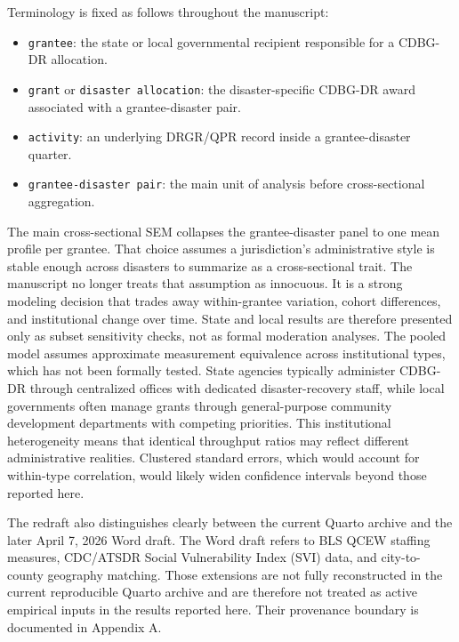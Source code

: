 \documentclass[
  letterpaper,
]{article}
\providecommand{\tightlist}{%
  \setlength{\itemsep}{0pt}\setlength{\parskip}{0pt}}
\begin{document}
Terminology is fixed as follows throughout the manuscript:

\begin{itemize}
\tightlist
\item
  \texttt{grantee}: the state or local governmental recipient
  responsible for a CDBG-DR allocation.
\item
  \texttt{grant} or \texttt{disaster\ allocation}: the disaster-specific
  CDBG-DR award associated with a grantee-disaster pair.
\item
  \texttt{activity}: an underlying DRGR/QPR record inside a
  grantee-disaster quarter.
\item
  \texttt{grantee-disaster\ pair}: the main unit of analysis before
  cross-sectional aggregation.
\end{itemize}

The main cross-sectional SEM collapses the grantee-disaster panel to one
mean profile per grantee. That choice assumes a jurisdiction's
administrative style is stable enough across disasters to summarize as a
cross-sectional trait. The manuscript no longer treats that assumption
as innocuous. It is a strong modeling decision that trades away
within-grantee variation, cohort differences, and institutional change
over time. State and local results are therefore presented only as
subset sensitivity checks, not as formal moderation analyses. The pooled
model assumes approximate measurement equivalence across institutional
types, which has not been formally tested. State agencies typically
administer CDBG-DR through centralized offices with dedicated
disaster-recovery staff, while local governments often manage grants
through general-purpose community development departments with competing
priorities. This institutional heterogeneity means that identical
throughput ratios may reflect different administrative realities.
Clustered standard errors, which would account for within-type
correlation, would likely widen confidence intervals beyond those
reported here.

The redraft also distinguishes clearly between the current Quarto
archive and the later April 7, 2026 Word draft. The Word draft refers to
BLS QCEW staffing measures, CDC/ATSDR Social Vulnerability Index (SVI)
data, and city-to-county geography matching. Those extensions are not
fully reconstructed in the current reproducible Quarto archive and are
therefore not treated as active empirical inputs in the results reported
here. Their provenance boundary is documented in Appendix A.
\end{document}
